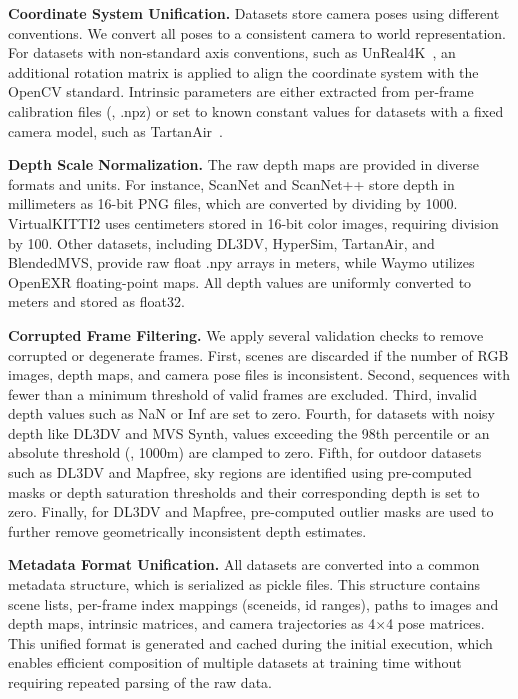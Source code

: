 \textbf{Coordinate System Unification.} Datasets store camera poses using different
conventions.  We convert all poses to a consistent camera to world representation.
For datasets with non-standard axis conventions, such as UnReal4K~\cite{tosi2021smd},  an additional rotation matrix is applied to align the coordinate system with the OpenCV standard. Intrinsic parameters are either extracted from per-frame calibration files (\eg, .npz) or set to known constant values for datasets with a fixed camera model, such as TartanAir~\cite{wang2020tartanair}.

\textbf{Depth Scale Normalization.} The raw depth maps are provided in diverse formats and units. For instance, ScanNet and ScanNet++ store depth in millimeters as 16-bit PNG files, which are converted by dividing by 1000. VirtualKITTI2 uses centimeters stored in 16-bit color images, requiring division by 100. Other datasets, including DL3DV, HyperSim, TartanAir, and BlendedMVS, provide raw float .npy arrays in meters, while Waymo utilizes OpenEXR floating-point maps. All depth values are uniformly converted to meters and stored as float32.

\textbf{Corrupted Frame Filtering.} We apply several validation checks to remove corrupted or degenerate frames. First, scenes are discarded if the number of RGB images, depth maps, and camera pose files is inconsistent. Second, sequences with fewer than a minimum threshold of valid frames are excluded. Third, invalid depth values such as NaN or Inf are set to zero. Fourth, for datasets with noisy depth like DL3DV and MVS Synth, values exceeding the 98th percentile or an absolute threshold (\eg, 1000m) are clamped to zero. Fifth, for outdoor datasets such as DL3DV and Mapfree, sky regions are identified using pre-computed masks or depth saturation thresholds and their corresponding depth is set to zero. 
Finally, for DL3DV and Mapfree, pre-computed outlier masks are used to further remove geometrically inconsistent depth estimates. 

\textbf{Metadata Format Unification.} All datasets are converted into a common metadata structure, which is serialized as pickle files. This structure contains scene lists, per-frame index mappings (sceneids, id ranges), paths to images and depth maps, intrinsic matrices, and camera trajectories as 4$\times$4 pose matrices. This unified format is generated and cached during the initial execution, which enables efficient composition of multiple datasets at training time without requiring repeated parsing of the raw data.




